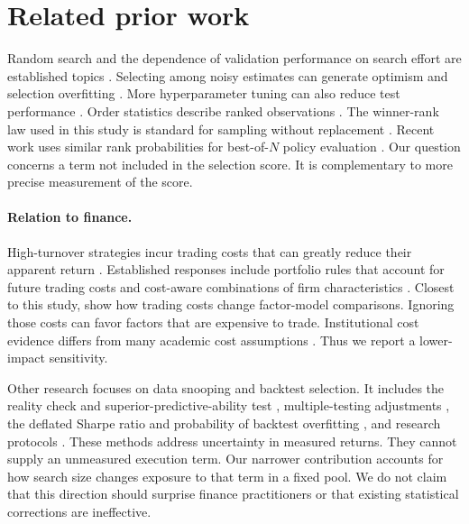 \documentclass{article}
\begin{document}
\section{Related prior work}
Random search and the dependence of validation performance on search effort are established topics \citep{bergstra2012,dodge2019,dodge2021}. Selecting among noisy estimates can generate optimism and selection overfitting \citep{smith2006,cawley2010}. More hyperparameter tuning can also reduce test performance \citep{schneider2025}. Order statistics describe ranked observations \citep{david2003order}. The winner-rank law used in this study is standard for sampling without replacement \citep{oneill2023order}. Recent work uses similar rank probabilities for best-of-$N$ policy evaluation \citep{schweisthal2026}. Our question concerns a term not included in the selection score. It is complementary to more precise measurement of the score.

\paragraph{Relation to finance.}
High-turnover strategies incur trading costs that can greatly reduce their apparent return \citep{lesmond2004illusory,korajczyk2004momentum,novymarx2016taxonomy,chen2023zeroing}. Established responses include portfolio rules that account for future trading costs \citep{garleanu2013dynamic} and cost-aware combinations of firm characteristics \citep{demiguel2020transaction}. Closest to this study, \citet{detzel2023model} show how trading costs change factor-model comparisons. Ignoring those costs can favor factors that are expensive to trade. Institutional cost evidence differs from many academic cost assumptions \citep{frazzini2018trading}. Thus we report a lower-impact sensitivity.

Other research focuses on data snooping and backtest selection. It includes the reality check and superior-predictive-ability test \citep{white2000reality,hansen2005test}, multiple-testing adjustments \citep{harvey2015backtesting,harvey2016cross}, the deflated Sharpe ratio and probability of backtest overfitting \citep{bailey2014deflated,bailey2017probability}, and research protocols \citep{arnott2019backtesting}. These methods address uncertainty in measured returns. They cannot supply an unmeasured execution term. Our narrower contribution accounts for how search size changes exposure to that term in a fixed pool. We do not claim that this direction should surprise finance practitioners or that existing statistical corrections are ineffective.
\end{document}
